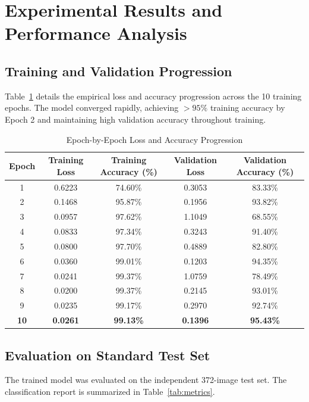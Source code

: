 \documentclass[11pt,a4paper]{article}
\begin{document}
\section{Experimental Results and Performance Analysis}

\subsection{Training and Validation Progression}
Table~\ref{tab:epoch_history} details the empirical loss and accuracy progression across the 10 training epochs. The model converged rapidly, achieving $>95\%$ training accuracy by Epoch 2 and maintaining high validation accuracy throughout training.

\begin{table}[h!]
\centering
\small
\caption{Epoch-by-Epoch Loss and Accuracy Progression}
\label{tab:epoch_history}
\begin{tabular}{@{}ccccc@{}}
\toprule
\textbf{Epoch} & \textbf{Training Loss} & \textbf{Training Accuracy (\%)} & \textbf{Validation Loss} & \textbf{Validation Accuracy (\%)} \\ \midrule
1 & 0.6223 & 74.60\% & 0.3053 & 83.33\% \\
2 & 0.1468 & 95.87\% & 0.1956 & 93.82\% \\
3 & 0.0957 & 97.62\% & 1.1049 & 68.55\% \\
4 & 0.0833 & 97.34\% & 0.3243 & 91.40\% \\
5 & 0.0800 & 97.70\% & 0.4889 & 82.80\% \\
6 & 0.0360 & 99.01\% & 0.1203 & 94.35\% \\
7 & 0.0241 & 99.37\% & 1.0759 & 78.49\% \\
8 & 0.0200 & 99.37\% & 0.2145 & 93.01\% \\
9 & 0.0235 & 99.17\% & 0.2970 & 92.74\% \\
\textbf{10} & \textbf{0.0261} & \textbf{99.13\%} & \textbf{0.1396} & \textbf{95.43\%} \\
\bottomrule
\end{tabular}
\end{table}

\subsection{Evaluation on Standard Test Set}
The trained model was evaluated on the independent 372-image test set. The classification report is summarized in Table~\ref{tab:metrics}.
\end{document}
